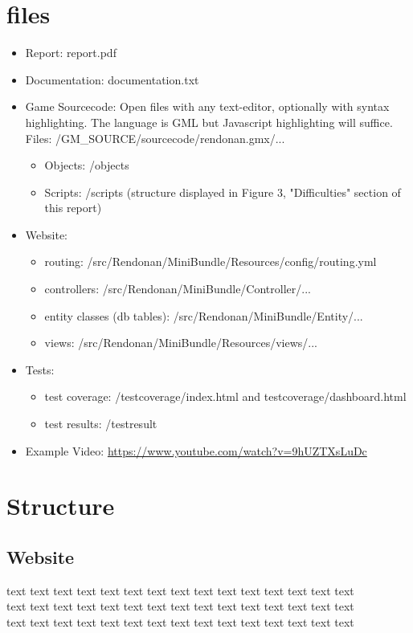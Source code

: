 \documentclass[12pt]{report}
\begin{document}
\section*{files}
\begin{itemize}
\item Report: report.pdf
\item Documentation: documentation.txt
\item Game Sourcecode: Open files with any text-editor, optionally with syntax highlighting. The language is GML but Javascript highlighting will suffice.
Files: /GM\_SOURCE/sourcecode/rendonan.gmx/...
\begin{itemize}
\item Objects: /objects
\item Scripts: /scripts (structure displayed in Figure 3, "Difficulties" section of this report)
\end{itemize}
\item Website:
\begin{itemize}
\item routing: /src/Rendonan/MiniBundle/Resources/config/routing.yml
\item controllers: /src/Rendonan/MiniBundle/Controller/...
\item entity classes (db tables): /src/Rendonan/MiniBundle/Entity/...
\item views: /src/Rendonan/MiniBundle/Resources/views/...
\end{itemize}
\item Tests:
\begin{itemize}
\item test coverage: /testcoverage/index.html and testcoverage/dashboard.html
\item test results: /testresult
\end{itemize}
\item Example Video: \url{https://www.youtube.com/watch?v=9hUZTXsLuDc}
\end{itemize}
\pagebreak

\section*{Structure}
\subsection*{Website}
text text text text text text text text text text text text text text text\\text text text text text text text text text text text text text text text\\text text text text text text text text text text text text text text text\\
\end{document}
